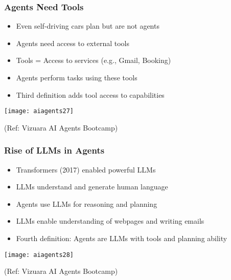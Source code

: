 \begin{frame}[fragile]\frametitle{Agents Need Tools}

      \begin{itemize}
        \item Even self-driving cars plan but are not agents
        \item Agents need access to external tools
        \item Tools = Access to services (e.g., Gmail, Booking)
        \item Agents perform tasks using these tools
        \item Third definition adds tool access to capabilities
      \end{itemize}

		\begin{center}
		\texttt{[image: aiagents27]}
		
		{\tiny (Ref: Vizuara AI Agents Bootcamp)}
		\end{center}	

\end{frame}

\begin{frame}[fragile]\frametitle{Rise of LLMs in Agents}

      \begin{itemize}
        \item Transformers (2017) enabled powerful LLMs
        \item LLMs understand and generate human language
        \item Agents use LLMs for reasoning and planning
        \item LLMs enable understanding of webpages and writing emails
        \item Fourth definition: Agents are LLMs with tools and planning ability
      \end{itemize}

		\begin{center}
		\texttt{[image: aiagents28]}
		
		{\tiny (Ref: Vizuara AI Agents Bootcamp)}
		\end{center}	

\end{frame}



